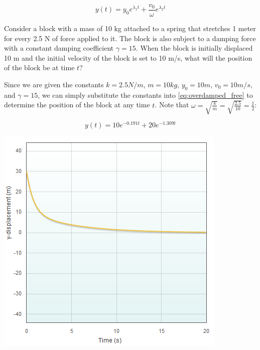 \documentclass[11pt]{article} %
\newenvironment{Figure}
  {\par\medskip\noindent\minipage{\linewidth}}
  {\endminipage\par\medskip}
\begin{document}
\begin{multicols}{2}
\begin{equation}\label{eq:overdamped_free}
y(t) = {y_0}e^{{\lambda}_1t} + \frac{v_0}{\omega}e^{{\lambda}_2t}
\end{equation}

Consider a block with a mass of 10 kg attached to a spring that stretches 1 meter for every 2.5 N of force applied to it. The block is also subject to a damping force with a constant damping coefficient $\gamma = 15$. When the block is initially displaced 10 m and the initial velocity of the block is set to 10 m/s, what will the position of the block be at time $t$?

Since we are given the constants $k = 2.5 N/m$, $m = 10 kg$, $y_0 = 10 m$, $v_0 = 10 m/s$, and $\gamma = 15$, we can simply substitute the constants into \eqref{eq:overdamped_free} to determine the position of the block at any time $t$. Note that $\omega = \sqrt{\frac{k}{m}} = \sqrt{\frac{2.5}{10}} = \frac{1}{2}$:

\begin{equation}
y(t) = 10e^{-0.191t} + 20e^{-1.309t}
\end{equation}

\begin{Figure}
 \centering
 \includegraphics[width=\linewidth]{overdamped_free.png}
\end{Figure}



\end{multicols}
\end{document}
